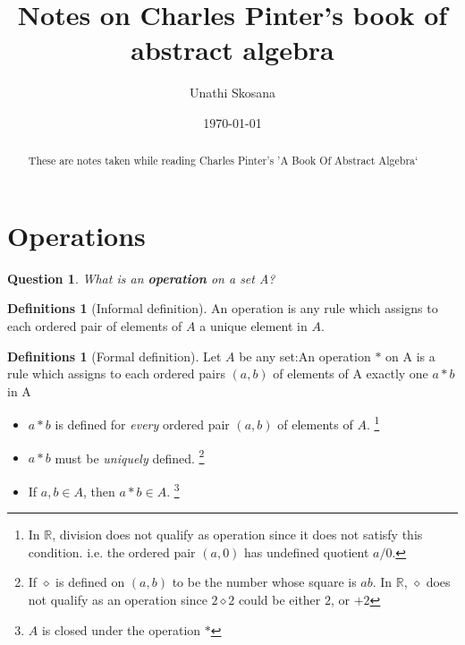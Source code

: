 \documentclass[nohyper,nobib]{tufte-handout}
\title{Notes on Charles Pinter's book of abstract algebra} %
\author{Unathi Skosana}
\date{\vspace{-5pt}\normalsize \today} %
\newtheorem{quest}[thm]{Question}
\theoremstyle{definition}
\newtheorem{defns}[thm]{Definitions}
\theoremstyle{remark}
\begin{document}
\justifying 
\maketitle

\begin{abstract}
\noindent
These are notes taken while reading Charles Pinter's 'A Book Of Abstract Algebra`
\end{abstract}

\tableofcontents

\section{Operations}

\begin{quest}
	What is an \textbf{operation} on a set A?
\end{quest}

\begin{defns}[Informal definition]
    An operation is any rule which assigns to each ordered pair of elements of $A$ a unique element in $A$.
\end{defns}

\begin{defns}[Formal definition]
	Let $A$ be any set:\newline An operation $*$ on A is a rule which assigns to each ordered pairs $(a,b)$ of elements of A exactly one $a * b$ in A
    \begin{itemize}
        \item $a * b$ is defined for \emph{every} ordered pair $(a,b)$ of elements of $A$. \footnote{In $\mathbb{R}$, division does not qualify as operation since it does not satisfy this condition. i.e. the ordered pair $(a, 0)$ has undefined quotient $a / 0$.}
        \item $a * b$ must be \emph{uniquely} defined. \footnote{If $\diamond$ is defined on $(a, b)$ to be the number whose square is $ab$. In $\mathbb{R}$, $\diamond$ does not qualify as an operation since $2 \diamond 2$  could be either $2$, or $+2$}
        \item If $a, b \in A$, then $a * b \in A$. \footnote{$A$ is closed under the operation $*$}
    \end{itemize}
\end{defns}
\end{document}
